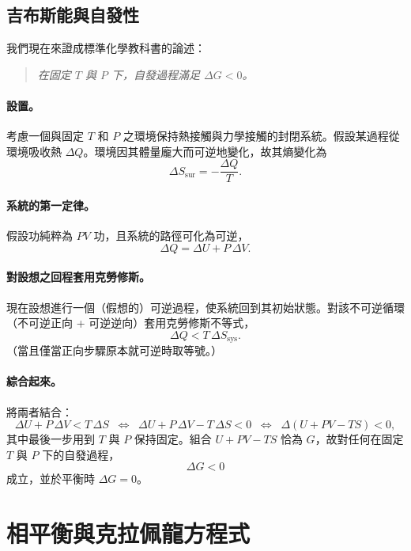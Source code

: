 \subsection{吉布斯能與自發性}

我們現在來證成標準化學教科書的論述：
\begin{quote}
\textit{在固定 $T$ 與 $P$ 下，自發過程滿足 $\Delta G < 0$。}
\end{quote}

\paragraph{設置。} 考慮一個與固定 $T$ 和 $P$ 之環境保持熱接觸與力學接觸的封閉系統。假設某過程從環境吸收熱 $\Delta Q$。環境因其體量龐大而可逆地變化，故其熵變化為
\[
    \Delta S_{\text{sur}} = -\frac{\Delta Q}{T}.
\]
\paragraph{系統的第一定律。} 假設功純粹為 $PV$ 功，且系統的路徑可化為可逆，
\[
    \Delta Q = \Delta U + P\,\Delta V.
\]
\paragraph{對設想之回程套用克勞修斯。} 現在設想進行一個（假想的）可逆過程，使系統回到其初始狀態。對該不可逆循環（不可逆正向 + 可逆逆向）套用克勞修斯不等式，
\[
    \Delta Q < T\,\Delta S_{\text{sys}}.
\]
（當且僅當正向步驟原本就可逆時取等號。）

\paragraph{綜合起來。} 將兩者結合：
\[
    \Delta U + P\,\Delta V < T\,\Delta S
    \;\;\Longleftrightarrow\;\;
    \Delta U + P\,\Delta V - T\,\Delta S < 0
    \;\;\Longleftrightarrow\;\;
    \Delta(U + PV - TS) < 0,
\]
其中最後一步用到 $T$ 與 $P$ 保持固定。組合 $U + PV - TS$ 恰為 $G$，故對任何在固定 $T$ 與 $P$ 下的自發過程，
\[
    \boxed{\,\Delta G < 0\,}
\]
成立，並於平衡時 $\Delta G = 0$。

\section{相平衡與克拉佩龍方程式}

